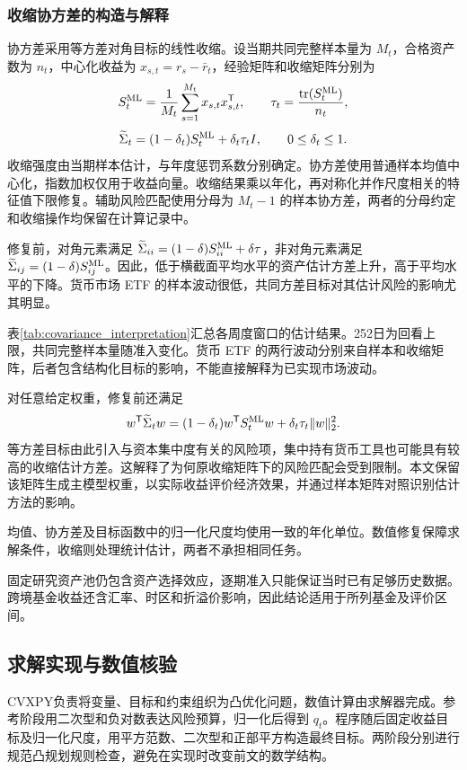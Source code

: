 \subsubsection{收缩协方差的构造与解释}
\label{sec:covariance_diagnostic}
协方差采用等方差对角目标的线性收缩\cite{ledoit2004well}。设当期共同完整样本量为 $M_t$，合格资产数为 $n_t$，中心化收益为 $x_{s,t}=r_s-\bar r_t$，经验矩阵和收缩矩阵分别为
\[
S_t^{\rm ML}=\frac1{M_t}\sum_{s=1}^{M_t}x_{s,t}x_{s,t}^{\mathsf T},\qquad
\tau_t=\frac{\operatorname{tr}(S_t^{\rm ML})}{n_t},
\]
\[
\widetilde\Sigma_t=(1-\delta_t)S_t^{\rm ML}+\delta_t\tau_t I,\qquad 0\leq\delta_t\leq1.
\]
收缩强度由当期样本估计，与年度惩罚系数分别确定。协方差使用普通样本均值中心化，指数加权仅用于收益向量。收缩结果乘以\annualizationDays{}年化，再对称化并作尺度相关的特征值下限修复。辅助风险匹配使用分母为 $M_t-1$ 的样本协方差，两者的分母约定和收缩操作均保留在计算记录中。

修复前，对角元素满足 $\widetilde\Sigma_{ii}=(1-\delta)S^{\rm ML}_{ii}+\delta\tau$，非对角元素满足 $\widetilde\Sigma_{ij}=(1-\delta)S^{\rm ML}_{ij}$。因此，低于横截面平均水平的资产估计方差上升，高于平均水平的下降。货币市场 ETF 的样本波动很低，共同方差目标对其估计风险的影响尤其明显。

\begin{table}[htbp]\centering
\caption{主模型周度决策中的协方差估计特征}\label{tab:covariance_interpretation}
\fitthesistable{}
\end{table}

表\ref{tab:covariance_interpretation}汇总各周度窗口的估计结果。252日为回看上限，共同完整样本量随准入变化。货币 ETF 的两行波动分别来自样本和收缩矩阵，后者包含结构化目标的影响，不能直接解释为已实现市场波动。

对任意给定权重，修复前还满足
\[
w^\mathsf T\widetilde\Sigma_t w
=(1-\delta_t)w^\mathsf T S_t^{\rm ML}w+\delta_t\tau_t\|w\|_2^2.
\]
等方差目标由此引入与资本集中度有关的风险项，集中持有货币工具也可能具有较高的收缩估计方差。这解释了为何原收缩矩阵下的风险匹配会受到限制。本文保留该矩阵生成主模型权重，以实际收益评价经济效果，并通过样本矩阵对照识别估计方法的影响。

均值、协方差及目标函数中的归一化尺度均使用一致的年化单位。数值修复保障求解条件，收缩则处理统计估计，两者不承担相同任务。

固定研究资产池仍包含资产选择效应，逐期准入只能保证当时已有足够历史数据。跨境基金收益还含汇率、时区和折溢价影响，因此结论适用于所列基金及评价区间。

\subsection{求解实现与数值核验}
CVXPY负责将变量、目标和约束组织为凸优化问题，数值计算由求解器完成。参考阶段用二次型和负对数表达风险预算，归一化后得到 $q_t$。程序随后固定收益目标及归一化尺度，用平方范数、二次型和正部平方构造最终目标。两阶段分别进行规范凸规划规则检查，避免在实现时改变前文的数学结构。

